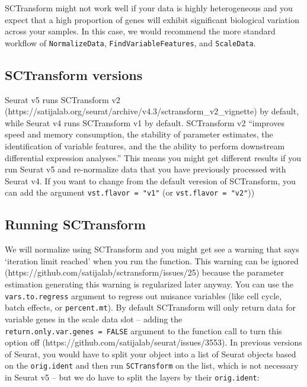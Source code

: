 \documentclass[
  letterpaper,
  DIV=11,
  numbers=noendperiod]{scrreprt}
\begin{document}
SCTransform might not work well if your data is highly heterogeneous and
you expect that a high proportion of genes will exhibit significant
biological variation across your samples. In this case, we would
recommend the more standard workflow of \texttt{NormalizeData},
\texttt{FindVariableFeatures}, and \texttt{ScaleData}.

\subsection{SCTransform versions}\label{sctransform-versions}

Seurat v5 runs SCTransform v2
(https://satijalab.org/seurat/archive/v4.3/sctransform\_v2\_vignette) by
default, while Seurat v4 runs SCTransform v1 by default. SCTransform v2
``improves speed and memory consumption, the stability of parameter
estimates, the identification of variable features, and the the ability
to perform downstream differential expression analyses.'' This means you
might get different results if you run Seurat v5 and re-normalize data
that you have previously processed with Seurat v4. If you want to change
from the default veresion of SCTransform, you can add the argument
\texttt{vst.flavor\ =\ "v1"} (or \texttt{vst.flavor\ =\ "v2"}))

\subsection{Running SCTransform}\label{running-sctransform}

We will normalize using SCTransform and you might get see a warning that
says `iteration limit reached' when you run the function. This warning
can be ignored (https://github.com/satijalab/sctransform/issues/25)
because the parameter estimation generating this warning is regularized
later anyway. You can use the \texttt{vars.to.regress} argument to
regress out nuisance variables (like cell cycle, batch effects, or
\texttt{percent.mt}). By default SCTransform will only return data for
variable genes in the scale data slot -- adding the
\texttt{return.only.var.genes\ =\ FALSE} argument to the function call
to turn this option off
(https://github.com/satijalab/seurat/issues/3553). In previous versions
of Seurat, you would have to split your object into a list of Seurat
objects based on the \texttt{orig.ident} and then run
\texttt{SCTransform} on the list, which is not necessary in Seurat v5 --
but we do have to split the layers by their \texttt{orig.ident}:
\end{document}
